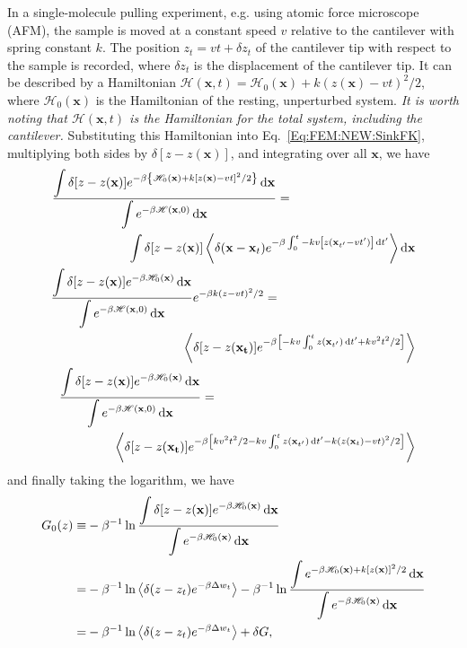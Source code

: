 In a single-molecule pulling experiment, e.g. using atomic force microscope (AFM), the sample is moved at a constant speed $v$ relative to the cantilever with spring constant $k$. The position $z_t=vt+\delta z_t$ of the cantilever tip with respect to the sample is recorded, where $\delta z_t$ is the displacement of the cantilever tip. It can be described by a Hamiltonian $\mathscr{H}(\mathbf{x},t)=\mathscr{H}_0(\mathbf{x})+k(z(\mathbf{x})-vt)^2/2$, where $\mathscr{H}_0(\mathbf{x})$ is the Hamiltonian of the resting, unperturbed system. \textit{It is worth noting that $\mathscr{H}(\mathbf{x},t)$ is the Hamiltonian for the total system, including the cantilever.} Substituting this Hamiltonian into Eq.~\ref{Eq:FEM:NEW:SinkFK}, multiplying both sides by $\delta[z-z(\mathbf{x})]$, and integrating over all $\mathbf{x}$, we have
\begin{align}
	\frac{\displaystyle\int\delta[z-z(\mathbf{x})]e^{-\beta \left\{\mathscr{H}_0(\mathbf{x})+k[z(\mathbf{x})-vt]^2/2\right\}}\diff \mathbf{x}}{\displaystyle\int e^{-\beta \mathscr{H}(\mathbf{x},0)}\diff \mathbf{x}}=\qquad\qquad\qquad\qquad\qquad&\notag\\
	\int \delta[z-z(\mathbf{x})] \left\langle \delta(\mathbf{x}-\mathbf{x}_t)e^{-\beta\int_0^t -kv\left[z(\mathbf{x}_{t^\prime}-vt^\prime)\right] \diff t^\prime}\right\rangle \diff \mathbf{x}\notag\\
	\frac{\displaystyle\int\delta[z-z(\mathbf{x})]e^{-\beta \mathscr{H}_0(\mathbf{x})}\diff \mathbf{x}}{\displaystyle\int e^{-\beta \mathscr{H}(\mathbf{x},0)}\diff \mathbf{x}}e^{-\beta k(z-vt)^2/2}=\qquad\qquad\qquad\qquad\qquad\quad&\notag\\
	\left\langle \delta[z-z(\mathbf{x_{t}})] e^{-\beta \left[-kv\int_0^t z(\mathbf{x}_{t^\prime})\diff t^\prime+kv^2t^2/2\right]}\right\rangle\notag\\
	\frac{\displaystyle\int\delta[z-z(\mathbf{x})]e^{-\beta \mathscr{H}_0(\mathbf{x})}\diff \mathbf{x}}{\displaystyle\int e^{-\beta \mathscr{H}(\mathbf{x},0)}\diff \mathbf{x}}=\qquad\qquad\qquad\qquad\qquad\qquad\qquad\qquad&\notag\\
	\left\langle \delta[z-z(\mathbf{x_{t}})] e^{-\beta \left[kv^2t^2/2-kv\int_0^t z(\mathbf{x}_{t^\prime})\diff t^\prime-k(z(\mathbf{x}_t)-vt)^2/2\right]}\right\rangle
\end{align}
and finally taking the logarithm, we have
\begin{align}
	G_0(z)\equiv&-\beta^{-1}\ln{\frac{\displaystyle\int\delta[z-z(\mathbf{x})]e^{-\beta \mathscr{H}_0(\mathbf{x})}\mathop{}\!\mathrm{d}\mathbf{x}}{\displaystyle\int e^{-\beta \mathscr{H}_0(\mathbf{x})}\mathop{}\!\mathrm{d}\mathbf{x}}}\notag\\
	      =&-\beta^{-1}\ln{\left<\delta(z-z_t)e^{-\beta \Delta w_t}\right>}-\beta^{-1}\ln{\frac{\displaystyle\int e^{-\beta \mathscr{H}_0(\mathbf{x})+k[z(\mathbf{x})]^2/2}\mathop{}\!\mathrm{d}\mathbf{x}}{\displaystyle\int e^{-\beta \mathscr{H}_0(\mathbf{x})}\mathop{}\!\mathrm{d}\mathbf{x}}}\notag\\
	      =&-\beta^{-1}\ln{\left<\delta(z-z_t)e^{-\beta \Delta w_t}\right>}+\delta G,
\end{align}
